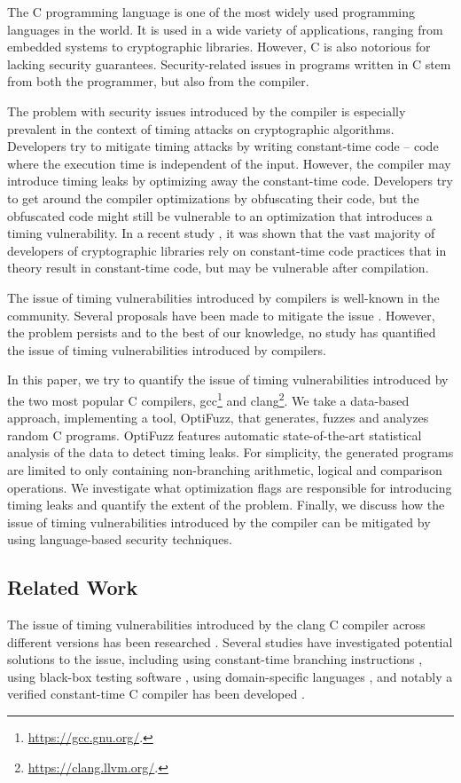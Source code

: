 The C programming language is one of the most widely used programming languages in the world. 
It is used in a wide variety of applications, ranging from embedded systems to cryptographic libraries. 
However, C is also notorious for lacking security guarantees.
Security-related issues in programs written in C stem from both the programmer, but also from the compiler.

The problem with security issues introduced by the compiler is especially prevalent in the context of timing attacks on cryptographic algorithms. 
Developers try to mitigate timing attacks by writing constant-time code -- code where the execution time is independent of the input.
However, the compiler may introduce timing leaks by optimizing away the constant-time code.
Developers try to get around the compiler optimizations by obfuscating their code, but the obfuscated code might still be vulnerable to an optimization that introduces a timing vulnerability.
In a recent study \citep{developer-survey-timing-attacks}, it was shown that the vast majority of developers of cryptographic libraries rely on constant-time code practices that in theory result in constant-time code, but may be vulnerable after compilation.

The issue of timing vulnerabilities introduced by compilers is well-known in the community.
Several proposals have been made to mitigate the issue \citep{what-you-c, dudect, fact, verified-constant-time-c-comiler}.
However, the problem persists and to the best of our knowledge, no study has quantified the issue of timing vulnerabilities introduced by compilers.

In this paper, we try to quantify the issue of timing vulnerabilities introduced by the two most popular C compilers, gcc\footnote{\url{https://gcc.gnu.org/}.} and clang\footnote{\url{https://clang.llvm.org/}.}.
We take a data-based approach, implementing a tool, OptiFuzz, that generates, fuzzes and analyzes random C programs.
OptiFuzz features automatic state-of-the-art statistical analysis of the data to detect timing leaks.
For simplicity, the generated programs are limited to only containing non-branching arithmetic, logical and comparison operations.
We investigate what optimization flags are responsible for introducing timing leaks and quantify the extent of the problem.
Finally, we discuss how the issue of timing vulnerabilities introduced by the compiler can be mitigated by using language-based security techniques.

\subsection{Related Work}
The issue of timing vulnerabilities introduced by the clang C compiler across different versions has been researched \citep{what-you-c}. 
Several studies have investigated potential solutions to the issue, including using constant-time branching instructions \citep{what-you-c}, using black-box testing software \citep{dudect}, using domain-specific languages \citep{fact}, and notably a verified constant-time C compiler has been developed \citep{verified-constant-time-c-comiler}.

